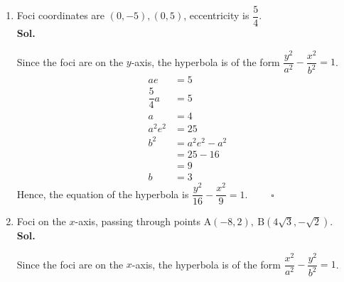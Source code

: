 \documentclass{report}
\newcommand{\sol}{\vspace{1em}\\\textbf{Sol.}}
\newcommand{\eos}{ \qquad \square}
\begin{document}
\begin{enumerate}[leftmargin=*]
\begin{enumerate}
              \item Foci coordinates are $(0,-5), (0,5)$, eccentricity is $\dfrac{5}{4}$. \sol{}

                    Since the foci are on the $y$-axis, the hyperbola is of the form
                    $\dfrac{y^2}{a^2}-\dfrac{x^2}{b^2}=1$.
                    \begin{align*}
                        ae            & = 5            \\
                        \dfrac{5}{4}a & = 5            \\
                        a             & = 4            \\
                        a^2e^2        & = 25           \\
                        b^2           & = a^2e^2 - a^2 \\
                                      & = 25 - 16      \\
                                      & = 9            \\
                        b             & = 3
                    \end{align*}
                    Hence, the equation of the hyperbola is $\dfrac{y^2}{16}-\dfrac{x^2}{9}=1$. $\eos$

                    \newpage
              \item Foci on the $x$-axis, passing through points $\mathrm{A}(-8,2), \mathrm{~B}(4
                        \sqrt{3},-\sqrt{2})$. \sol{}

                    Since the foci are on the $x$-axis, the hyperbola is of the form
                    $\dfrac{x^2}{a^2}-\dfrac{y^2}{b^2}=1$.


\end{enumerate}
\end{enumerate}
\end{document}
